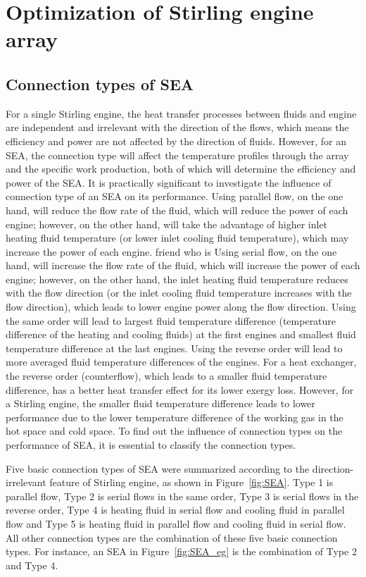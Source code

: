 \chapter{Optimization of Stirling engine array}

\section{Connection types of SEA}
\label{sec:connectionTypes}
For a single Stirling engine, the heat transfer processes between fluids and engine are independent and irrelevant with the direction of the flows, which means the efficiency and power are not affected by the direction of fluids. However, for an SEA, the connection type will affect the temperature profiles through the array and the specific work production, both of which will determine the efficiency and power of the SEA. It is practically significant to investigate the influence of connection type of an SEA on its performance. Using parallel flow, on the one hand, will reduce the flow rate of the fluid, which will reduce the power of each engine; however, on the other hand, will take the advantage of higher inlet heating fluid temperature (or lower inlet cooling fluid temperature), which may increase the power of each engine. friend who is Using serial flow, on the one hand, will increase the flow rate of the fluid, which will increase the power of each engine; however, on the other hand, the inlet heating fluid temperature reduces with the flow direction (or the inlet cooling fluid temperature increases with the flow direction), which leads to lower engine power along the flow direction. Using the same order will lead to largest fluid temperature difference (temperature difference of the heating and cooling fluids) at the first engines and smallest fluid temperature difference at the last engines. Using the reverse order will lead to more averaged fluid temperature differences of the engines. For a heat exchanger, the reverse order (counterflow), which leads to a smaller fluid temperature difference, has a better heat transfer effect for its lower exergy loss. However, for a Stirling engine, the smaller fluid temperature difference leads to lower performance due to the lower temperature difference of the working gas in the hot space and cold space. To find out the influence of connection types on the performance of SEA, it is essential to classify the connection types.

Five basic connection types of SEA were summarized according to the direction-irrelevant feature of Stirling engine, as shown in Figure~\ref{fig:SEA}. Type 1 is parallel flow, Type 2 is serial flows in the same order, Type 3 is serial flows in the reverse order, Type 4 is heating fluid in serial flow and cooling fluid in parallel flow and Type 5 is heating fluid in parallel flow and cooling fluid in serial flow. All other connection types are the combination of these five basic connection types. For instance, an SEA in Figure~\ref{fig:SEA_eg} is the combination of Type 2 and Type 4. 

